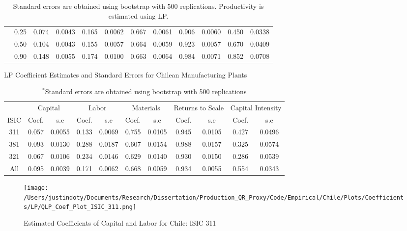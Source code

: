 \documentclass[11pt]{article}
\begin{document}
\begin{table}[H]
\begin{tabular}{cccccccccccc}
   & 0.25 & 0.074 & 0.0043 & 0.165 & 0.0062 & 0.667 & 0.0061 & 0.906 & 0.0060 & 0.450 & 0.0338 \\ 
   & 0.50 & 0.104 & 0.0043 & 0.155 & 0.0057 & 0.664 & 0.0059 & 0.923 & 0.0057 & 0.670 & 0.0409 \\ 
   & 0.90 & 0.148 & 0.0055 & 0.174 & 0.0100 & 0.663 & 0.0064 & 0.984 & 0.0071 & 0.852 & 0.0708 \\ 
   \hline
\end{tabular}
\caption*{\footnotesize Standard errors are obtained using bootstrap with 500 replications. Productivity is estimated using LP.}
\label{CHLestLP}
\end{table}

\begin{table}[H]
\centering
\caption{LP Coefficient Estimates and Standard Errors for Chilean Manufacturing Plants}
\begin{tabular}{ccccccccccc}
  \hline\hline & \multicolumn{2}{c}{Capital} & \multicolumn{2}{c}{Labor} & \multicolumn{2}{c}{Materials} & \multicolumn{2}{c}{Returns to Scale} & \multicolumn{2}{c}{Capital Intensity}\\ \cmidrule(lr){2-3} \cmidrule(lr){4-5} \cmidrule(lr){6-7} \cmidrule(lr){8-9} \cmidrule(lr){10-11}ISIC & Coef. & s.e & Coef. & s.e & Coef. & s.e & Coef. & s.e & Coef. & s.e \\ 
  \hline
311 & 0.057 & 0.0055 & 0.133 & 0.0069 & 0.755 & 0.0105 & 0.945 & 0.0105 & 0.427 & 0.0496 \\ 
  381 & 0.093 & 0.0130 & 0.288 & 0.0187 & 0.607 & 0.0154 & 0.988 & 0.0157 & 0.325 & 0.0574 \\ 
  321 & 0.067 & 0.0106 & 0.234 & 0.0146 & 0.629 & 0.0140 & 0.930 & 0.0150 & 0.286 & 0.0539 \\ 
  All & 0.095 & 0.0039 & 0.171 & 0.0062 & 0.668 & 0.0059 & 0.934 & 0.0055 & 0.554 & 0.0343 \\ 
   \hline
\end{tabular}
\caption*{\footnotesize $^{*}$Standard errors are obtained using bootstrap with 500 replications}
\label{CHLLPcoef}
\end{table}

\begin{figure}[H]
\centering
\caption{Estimated Coefficients of Capital and Labor for Chile: ISIC 311}
\texttt{[image: /Users/justindoty/Documents/Research/Dissertation/Production\_QR\_Proxy/Code/Empirical/Chile/Plots/Coefficients/LP/QLP\_Coef\_Plot\_ISIC\_311.png]}
\label{fig:LPCHL311}
\end{figure}
\end{document}
